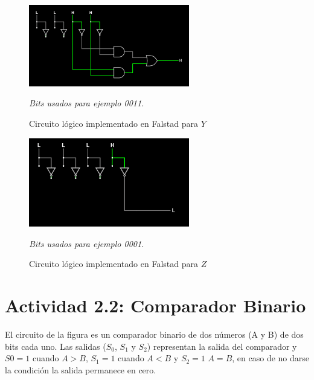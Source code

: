 \begin{figure}[h!]
    \centering
    \includegraphics[width=7cm]{imagenes/2.1_Y.png}
    \caption{Circuito lógico implementado en Falstad para $Y$}
    \label{fig:falstad}
    \footnotesize\textit{Bits usados para ejemplo 0011.}
\end{figure}

\begin{figure}[h!]
    \centering
    \includegraphics[width=7cm]{imagenes/2.1_Z.png}
    \caption{Circuito lógico implementado en Falstad para $Z$}
    \label{fig:falstad}
    \footnotesize\textit{Bits usados para ejemplo 0001.}
\end{figure}



\saltoPag

\section{Actividad 2.2: Comparador Binario}

El circuito de la figura es un comparador binario de dos números (A y B) de dos bits cada uno. Las
salidas ($S_0$, $S_1$ y $S_2$) representan la salida del comparador y $S0=1$ cuando $A>B$, $S_1= 1$ cuando $A < B$ y
$S_2=1$ $A=B$, en caso de no darse la condición la salida permanece en cero.

